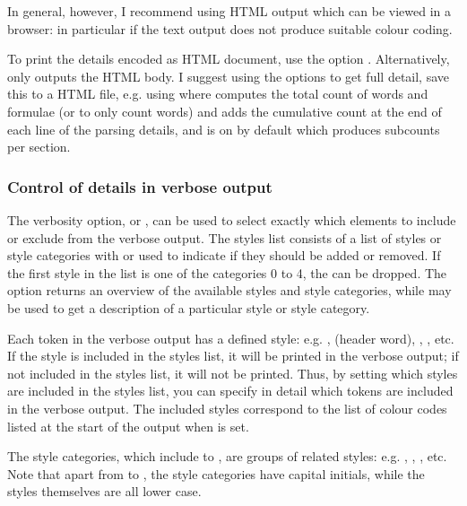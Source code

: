 \documentclass{article}
\begin{document}
In general, however, I recommend using HTML output which can be viewed in a browser: in particular if the text output does not produce suitable colour coding.

To print the details encoded as HTML document, use the option . Alternatively,  only outputs the HTML body. I suggest using the options  to get full detail, save this to a HTML file, e.g. using
where  computes the total count of words and formulae (or  to only count words) and adds the cumulative count at the end of each line of the parsing details, and  is on by default which produces subcounts per section.

\subsubsection{Control of details in verbose output}

The verbosity option,  or , can be used to select exactly which elements to include or exclude from the verbose output. The styles list consists of a list of styles or style categories with  or  used to indicate if they should be added or removed. If the first style in the list is one of the categories 0 to 4, the \code{=} can be dropped. The option  returns an overview of the available styles and style categories, while  may be used to get a description of a particular style or style category.

Each token in the verbose output has a defined style: e.g. ,  (header word), , , etc. If the style is included in the styles list, it will be printed in the verbose output; if not included in the styles list, it will not be printed. Thus, by setting which styles are included in the styles list, you can specify in detail which tokens are included in the verbose output. The included styles correspond to the list of colour codes listed at the start of the output when  is set.

The style categories, which include  to , are groups of related styles: e.g. , , , etc. Note that apart from  to , the style categories have capital initials, while the styles themselves are all lower case.
\end{document}
